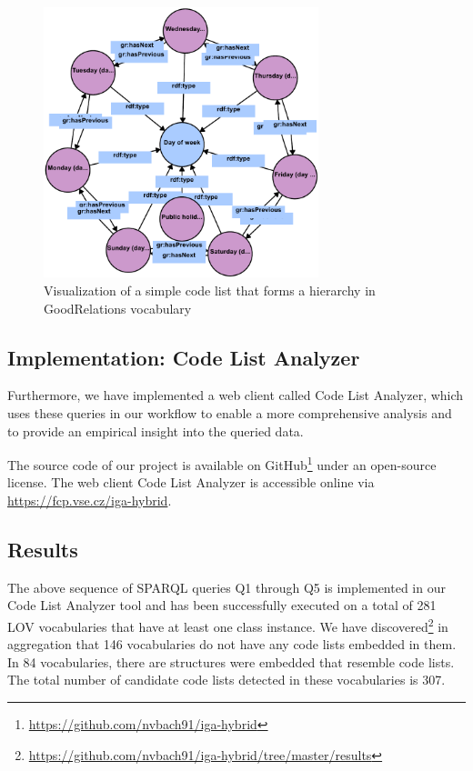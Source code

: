 \begin{figure}[h]
\centering
\includegraphics[width=8cm]{figures/code-list-days-of-week}
\caption{Visualization of a simple code list that forms a hierarchy in GoodRelations vocabulary}
\label{fig:code-list-with-hierarchy}
\end{figure}

\subsection{Implementation: Code List Analyzer}

Furthermore, we have implemented a web client called Code List Analyzer, which uses these queries in our workflow to enable a more comprehensive analysis and to provide an empirical insight into the queried data.

The source code of our project is available on GitHub\footnote{\url{https://github.com/nvbach91/iga-hybrid}} under an open-source license. The web client Code List Analyzer is accessible online via \url{https://fcp.vse.cz/iga-hybrid}.

\subsection{Results}

The above sequence of SPARQL queries Q1 through Q5 is implemented in our Code List Analyzer tool and has been successfully executed on a total of 281 LOV vocabularies that have at least one class instance. We have discovered\footnote{\url{https://github.com/nvbach91/iga-hybrid/tree/master/results}} in aggregation that 146 vocabularies do not have any code lists embedded in them. %
In 84 vocabularies, there are structures were embedded that resemble code lists. The total number of candidate code lists detected in these vocabularies is 307. 

